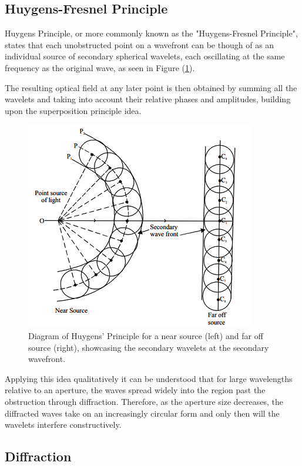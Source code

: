 \documentclass[12pt]{article}
\begin{document}
\subsection{Huygens-Fresnel Principle} \label{sec:2.2}

Huygens Principle, or  more commonly known as the "Huygens-Fresnel Principle", states that each unobstructed point on a wavefront can be though of as an individual source of secondary spherical wavelets, each oscillating at the same frequency as the original wave,
as seen in Figure (\ref{fig:2}). \cite{hecht2012optics,enwiki:1291861847,likharev2013essential,Born_Wolf_Bhatia_Clemmow_Gabor_Stokes_Taylor_Wayman_Wilcock_1999}

The resulting optical field at any later point is then obtained by summing all the wavelets and taking into account their relative phases and amplitudes, building upon the superposition principle idea. \cite{hecht2012optics,Born_Wolf_Bhatia_Clemmow_Gabor_Stokes_Taylor_Wayman_Wilcock_1999}

\begin{figure}[H]
    \centering
    \includegraphics[width=.45\textwidth]{huygens.png}
    \caption{Diagram of Huygens' Principle for a near source (left) and far off source (right), showcasing the secondary wavelets at the secondary wavefront. \cite{huygensimgsource}}
    \label{fig:2}
\end{figure}

Applying this idea qualitatively it can be understood that for large wavelengths relative to an aperture, the waves spread widely into the region past the obstruction through diffraction.
Therefore, as the aperture size decreases, the diffracted waves take on an increasingly circular form and only then will the wavelets interfere constructively. \cite{hecht2012optics,Born_Wolf_Bhatia_Clemmow_Gabor_Stokes_Taylor_Wayman_Wilcock_1999}

\subsection{Diffraction} \label{sec:2.3}
\end{document}
